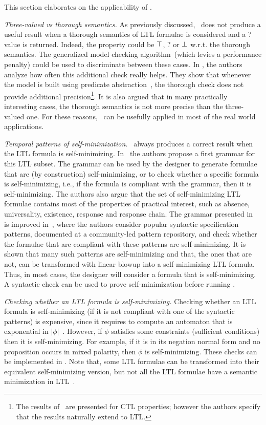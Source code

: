 This section elaborates on the applicability of \NAME. 

\emph{Three-valued vs thorough semantics.} As previously discussed, \NAME\ does not produce a useful result when a thorough semantics of LTL formulae is considered and a $?$ value is returned.
Indeed, the property could be $\operatorname{\top}$, $?$ or $\operatorname{\bot}$ w.r.t. the thorough semantics.
The generalized model checking algorithm~\cite{bruns2000model}(which levies a performance penalty) could be used to discriminate between these cases.
In \cite{gurfinkel2005thorough}, the authors analyze how often this additional check really helps.
They show that whenever the model is built using predicate abstraction~\cite{graf1997construction}, the thorough check does not provide additional precision\footnote{The results of~\cite{gurfinkel2005thorough} are presented for CTL properties; however the authors specify that the results naturally extend to LTL.}.
It is also argued that in many practically interesting cases, the thorough semantics is not more precise than the three-valued one. 
For these reasons, \NAME\ can be usefully applied in most of the real world applications.

\emph{Temporal patterns of self-minimization.} 
\NAME\ always produces a correct result when the LTL formula is self-minimizing.
In~\cite{godefroid2005MCvsGMC} the authors propose a first grammar for this LTL subset. 
The grammar can be used by the designer to generate formulae that are (by construction) self-minimizing, or  to check whether a specific formula is self-minimizing, i.e., if the formula is compliant with the grammar, then it is self-minimizing.
The authors also argue that the set of self-minimizing LTL formulae contains most of the properties of practical interest, such as absence, universality, existence, response and response chain. 
The grammar presented in~\cite{godefroid2005MCvsGMC} is improved in~\cite{antonik2006efficient}, where the authors consider popular syntactic specification patterns, documented at a community-led pattern repository, and check whether the formulae that are compliant with these patterns are self-minimizing.
It is shown that many such patterns are self-minimizing and that, the ones that are not, can be transformed with linear blowup into a self-minimizing LTL formula.
Thus, in most cases, the designer will consider a formula that is self-minimizing. A syntactic check can be used to prove self-minimization before running \NAME .

\emph{Checking whether an LTL formula is self-minimizing.} Checking whether an LTL formula is self-minimizing (if it is not compliant with one of the syntactic patterns) is expensive, since it requires to compute an automaton that is exponential in $|\phi|$~\cite{godefroid2005MCvsGMC}. 
However, if $\phi$ satisfies some constraints (sufficient conditions) then it is self-minimizing.
For example, if it is in its negation normal form and no proposition occurs in mixed polarity, then $\phi$ is self-minimizing.
These checks can be implemented in \NAME . Note that, some LTL formulae can be transformed into their equivalent self-minimizing version, but not all the LTL formulae have a semantic minimization in LTL~\cite{godefroid2005MCvsGMC}.

